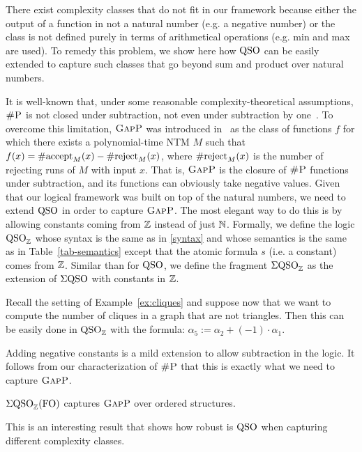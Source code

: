
There exist complexity classes that do not fit in our framework because either the output of a function in not a natural number (e.g. a negative number) or the class is not defined purely in terms of arithmetical operations (e.g. min and max are used).
To remedy this problem, we show here how ${\rm QSO}$ can be easily extended  to capture such classes that go beyond sum and product over natural numbers. 

It is well-known that, under some reasonable complexity-theoretical assumptions, $\text{\sc \#P}$ is not closed under subtraction, not even under subtraction by one~\cite{OH93}.
To overcome this limitation, $\text{\sc GapP}$ was introduced in~\cite{FFK94} as the class of functions $f$ for which there exists a polynomial-time NTM $M$ such that $f(x) = \text{\rm \#accept}_M(x) - \text{\rm \#reject}_M(x)$, where  $\text{\rm \#reject}_M(x)$ is the number of rejecting runs of $M$ with input $x$.
That is, $\text{\sc GapP}$ is the closure of $\text{\sc \#P}$ functions under subtraction, and its functions can obviously take negative values.
Given that our logical framework was built on top of the natural numbers, we need to extend ${\rm QSO}$ in order to %
capture $\text{\sc GapP}$. 
The most elegant way to do this is by allowing constants coming from $\mathbb{Z}$ instead of just $\mathbb{N}$. 
Formally, we define the logic ${\rm QSO}_{\mathbb{Z}}$ whose syntax is the same as in \eqref{syntax} and whose semantics is the same as in Table~\ref{tab-semantics} except that the atomic formula $s$ (i.e. a constant) comes from $\mathbb{Z}$.  
Similar than for ${\rm QSO}$, we define the fragment $\Sigma{\rm QSO}_{\mathbb{Z}}$ as the extension of $\Sigma{\rm QSO}$ with constants in $\mathbb{Z}$.
\begin{example}
	Recall the setting of Example~\ref{ex:cliques} and suppose now that we want to compute the number of cliques in a graph that are not triangles. Then this can be easily done in ${\rm QSO}_{\mathbb{Z}}$ with the formula:
	$
	\alpha_5 :=	\alpha_2 + (-1) \cdot \alpha_1 
	$.
\end{example}
Adding negative constants is a mild extension to allow subtraction in the logic. 
It follows from our characterization of $\text{\sc \#P}$ that this is exactly what we need to capture  $\text{\sc GapP}$.
\begin{corollary} \label{prop:capture-gapp}
	$\Sigma{\rm QSO}_{\mathbb{Z}}({\rm FO})$ captures $\text{\sc GapP}$ over ordered structures.
\end{corollary}
This is an interesting result that shows how robust is ${\rm QSO}$ when capturing different complexity classes.

